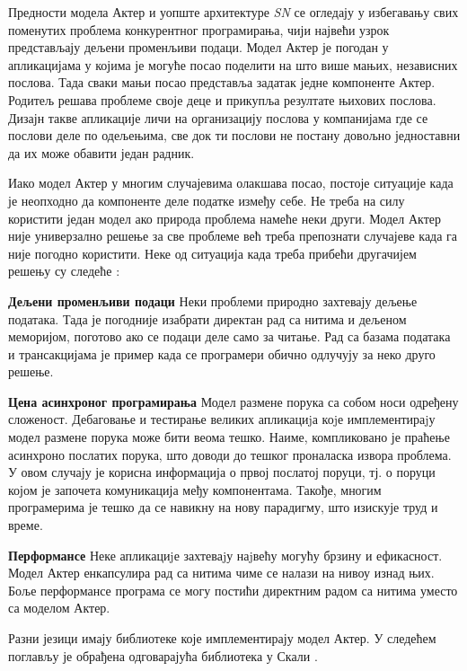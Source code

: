 \documentclass[12pt,oneside]{memoir}
\begin{document}
Предности модела Актер и уопште архитектуре \textit{SN} се огледају у избегавању свих поменутих проблема конкурентног програмирања, чији највећи узрок представљају дељени променљиви подаци. Модел Актер је погодан у апликацијама у којима је могуће посао поделити на што више мањих, независних послова. Тада сваки мањи посао представља задатак једне компоненте Актер. Родитељ решава проблеме своје деце и прикупља резултате њихових послова. Дизајн такве апликације личи на организацију послова у компанијама где се послови деле по одељењима, све док ти послови не постану довољно једноставни да их може обавити један радник. 

Иако модел Актер у многим случајевима олакшава посао, постоје ситуације када је неопходно да компоненте деле податке између себе. Не треба на силу користити један модел ако природа проблема намеће неки други. Модел Актер није универзално решење за све проблеме већ треба препознати случајеве када га није погодно користити. Неке од ситуација када треба прибећи другачијем решењу су следеће \cite{progInScala3}:

\begin{description}
\item \textbf{Дељени променљиви подаци} Неки проблеми природно захтевају дељење података. Тада је погодније изабрати директан рад са нитима и дељеном меморијом, поготово ако се подаци деле само за читање. Рад са базама података и трансакцијама је пример када се програмери обично одлучују за неко друго решење.
\item \textbf{Цена асинхроног програмирања} Модел размене порука са собом носи одређену сложеност. Дебаговање и тестирање великих апликациjа коjе имплементираjу модел размене порука може бити веома тешко. Наиме, компликовано је праћење асинхроно послатих порука, што доводи до тешког проналаска извора проблема. У овом случају је корисна информација о првој послатој поруци, тј. о поруци којом је започета комуникација међу компонентама. Такође, многим програмерима је тешко да се навикну на нову парадигму, што изискује труд и време.
\item \textbf{Перформансе} Неке апликациjе захтеваjу наjвећу могућу брзину и ефикасност. Модел Актер енкапсулира рад са нитима чиме се налази на нивоу изнад њих. Боље перформансе програма се могу постићи директним радом са нитима уместо са моделом Актер.
\end{description}

Разни језици имају библиотеке које имплементирају модел Актер. У следећем поглављу је обрађена одговарајућа библиотека у Скали \cite{progInScala3, carlHewittActor, seven}.
\end{document}
